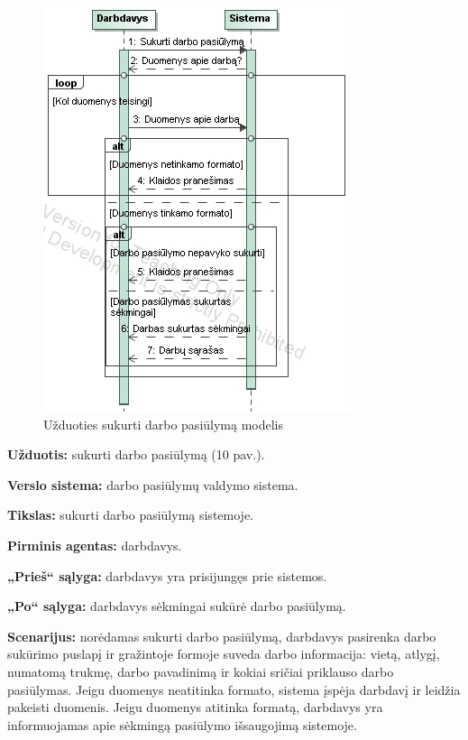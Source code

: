 \documentclass{VUMIFPSkursinis}
\begin{document}
\begin{figure}[H]
\centering
\includegraphics[scale=1]{img/sukurtiDarba.png}
\caption{Užduoties sukurti darbo pasiūlymą modelis}
\end{figure}

\textbf{Užduotis:} sukurti darbo pasiūlymą (10 pav.).

\textbf{Verslo sistema:} darbo pasiūlymų valdymo sistema.

\textbf{Tikslas:} sukurti darbo pasiūlymą sistemoje.

\textbf{Pirminis agentas:} darbdavys.

\textbf{„Prieš“ sąlyga:} darbdavys yra prisijungęs prie sistemos.

\textbf{„Po“ sąlyga:} darbdavys sėkmingai sukūrė darbo pasiūlymą.

\textbf{Scenarijus:} norėdamas sukurti darbo pasiūlymą, darbdavys pasirenka darbo sukūrimo puslapį ir gražintoje formoje suveda darbo informacija: vietą, atlygį, numatomą trukmę, darbo pavadinimą ir kokiai sričiai priklauso darbo pasiūlymas. Jeigu duomenys neatitinka formato, sistema įspėja darbdavį ir leidžia pakeisti duomenis. Jeigu duomenys atitinka formatą, darbdavys yra informuojamas apie sėkmingą pasiūlymo išsaugojimą sistemoje.
\end{document}
